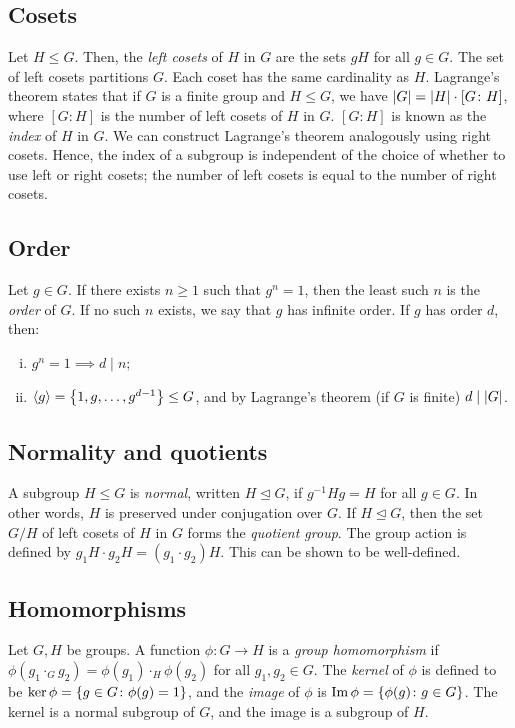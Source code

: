\subsection{Cosets}
Let \( H \leq G \).
Then, the \textit{left cosets} of \( H \) in \( G \) are the sets \( gH \) for all \( g \in G \).
The set of left cosets partitions \( G \).
Each coset has the same cardinality as \( H \).
Lagrange's theorem states that if \( G \) is a finite group and \( H \leq G \), we have \( \abs{G} = \abs{H} \cdot [G \colon H] \), where \( [G \colon H] \) is the number of left cosets of \( H \) in \( G \).
\( [G \colon H] \) is known as the \textit{index} of \( H \) in \( G \).
We can construct Lagrange's theorem analogously using right cosets.
Hence, the index of a subgroup is independent of the choice of whether to use left or right cosets; the number of left cosets is equal to the number of right cosets.

\subsection{Order}
Let \( g \in G \).
If there exists \( n \geq 1 \) such that \( g^n = 1 \), then the least such \( n \) is the \textit{order} of \( G \).
If no such \( n \) exists, we say that \( g \) has infinite order.
If \( g \) has order \( d \), then:
\begin{enumerate}[(i)]
	\item \( g^n = 1 \implies d \mid n \);
	\item \( \langle{} g \rangle = \qty{1, g, \dots, g^{d-1}} \leq G \), and by Lagrange's theorem (if \( G \) is finite) \( d \mid \abs{G} \).
\end{enumerate}

\subsection{Normality and quotients}
A subgroup \( H \leq G \) is \textit{normal}, written \( H \trianglelefteq G \), if \( g^{-1} H g = H \) for all \( g \in G \).
In other words, \( H \) is preserved under conjugation over \( G \).
If \( H \trianglelefteq G \), then the set \( G/H \) of left cosets of \( H \) in \( G \) forms the \textit{quotient group}.
The group action is defined by \( g_1 H \cdot g_2 H = (g_1 \cdot g_2) H \).
This can be shown to be well-defined.

\subsection{Homomorphisms}
Let \( G, H \) be groups.
A function \( \phi \colon G \to H \) is a \textit{group homomorphism} if \( \phi(g_1 \cdot_G g_2) = \phi(g_1) \cdot_H \phi(g_2) \) for all \( g_1, g_2 \in G \).
The \textit{kernel} of \( \phi \) is defined to be \( \ker \phi = \qty{g \in G \colon \phi(g) = 1} \), and the \textit{image} of \( \phi \) is \( \Im \phi = \qty{\phi(g) \colon g \in G} \).
The kernel is a normal subgroup of \( G \), and the image is a subgroup of \( H \).
